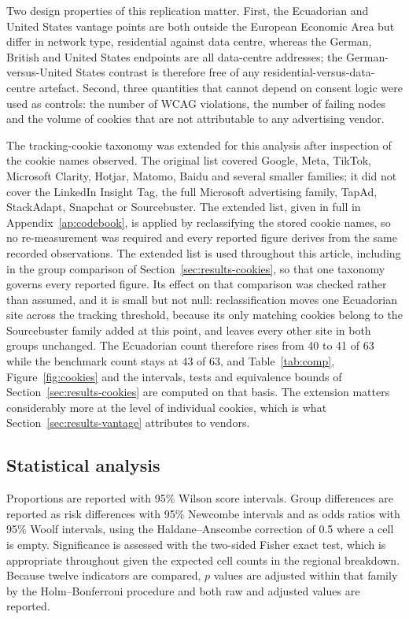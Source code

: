 \documentclass[pdflatex,sn-basic,Numbered,iicol]{sn-jnl}
\theoremstyle{thmstyleone}
\theoremstyle{thmstyletwo}
\theoremstyle{thmstylethree}
\begin{document}
	Two design properties of this replication matter. First, the Ecuadorian and United States vantage points are both outside the European Economic Area but differ in network type, residential against data centre, whereas the German, British and United States endpoints are all data-centre addresses; the German-versus-United States contrast is therefore free of any residential-versus-data-centre artefact. Second, three quantities that cannot depend on consent logic were used as controls: the number of WCAG violations, the number of failing nodes and the volume of cookies that are not attributable to any advertising vendor.
	
	The tracking-cookie taxonomy was extended for this analysis after inspection of the cookie names observed. The original list covered Google, Meta, TikTok, Microsoft Clarity, Hotjar, Matomo, Baidu and several smaller families; it did not cover the LinkedIn Insight Tag, the full Microsoft advertising family, TapAd, StackAdapt, Snapchat or Sourcebuster. The extended list, given in full in Appendix~\ref{ap:codebook}, is applied by reclassifying the stored cookie names, so no re-measurement was required and every reported figure derives from the same recorded observations. The extended list is used throughout this article, including in the group comparison of Section~\ref{sec:results-cookies}, so that one taxonomy governs every reported figure. Its effect on that comparison was checked rather than assumed, and it is small but not null: reclassification moves one Ecuadorian site across the tracking threshold, because its only matching cookies belong to the Sourcebuster family added at this point, and leaves every other site in both groups unchanged. The Ecuadorian count therefore rises from 40 to 41 of 63 while the benchmark count stays at 43 of 63, and Table~\ref{tab:comp}, Figure~\ref{fig:cookies} and the intervals, tests and equivalence bounds of Section~\ref{sec:results-cookies} are computed on that basis. The extension matters considerably more at the level of individual cookies, which is what Section~\ref{sec:results-vantage} attributes to vendors.
	
	\subsection{Statistical analysis}\label{sec:methods-stats}
	
	Proportions are reported with 95\% Wilson score intervals. Group differences are reported as risk differences with 95\% Newcombe intervals and as odds ratios with 95\% Woolf intervals, using the Haldane--Anscombe correction of 0.5 where a cell is empty. Significance is assessed with the two-sided Fisher exact test, which is appropriate throughout given the expected cell counts in the regional breakdown. Because twelve indicators are compared, $p$ values are adjusted within that family by the Holm--Bonferroni procedure and both raw and adjusted values are reported.
	
\end{document}
